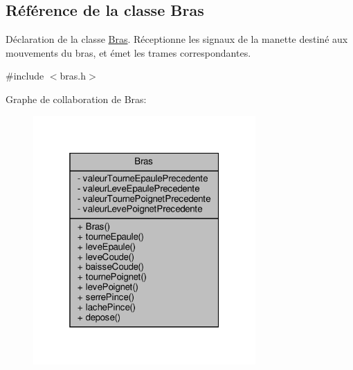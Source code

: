 \hypertarget{class_bras}{}\subsection{Référence de la classe Bras}
\label{class_bras}


Déclaration de la classe \hyperlink{class_bras}{Bras}. Réceptionne les signaux de la manette destiné aux mouvements du bras, et émet les trames correspondantes.  




{\ttfamily \#include $<$bras.\+h$>$}



Graphe de collaboration de Bras\+:
\nopagebreak
\begin{figure}[H]
\begin{center}
\leavevmode
\includegraphics[width=241pt]{class_bras__coll__graph}
\end{center}
\end{figure}
